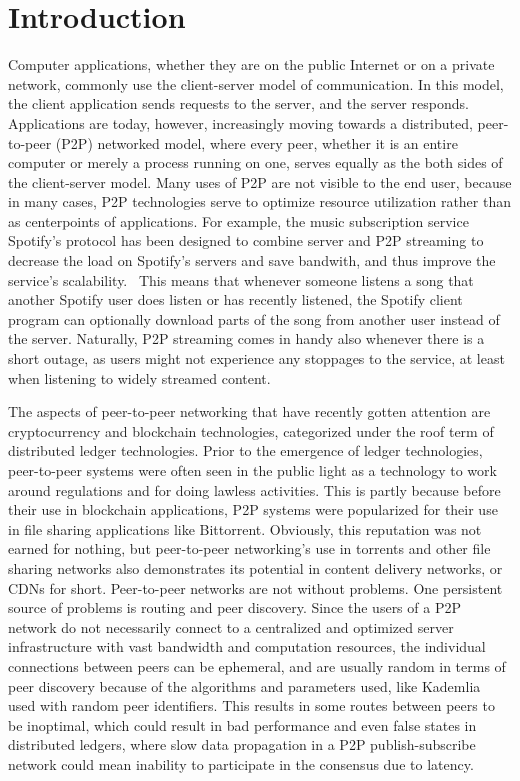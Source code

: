 \chapter{Introduction}
\label{Introduction}

Computer applications, whether they are on the public Internet or on a private network, commonly use the client-server model of communication. In this model, the client application sends requests to the server, and the server responds. Applications are today, however, increasingly moving towards a distributed, peer-to-peer (P2P) networked model, where every peer, whether it is an entire computer or merely a process running on one, serves equally as the both sides of the client-server model. Many uses of P2P are not visible to the end user, because in many cases, P2P technologies serve to optimize resource utilization rather than as centerpoints of applications. For example, the music subscription service Spotify's protocol has been designed to combine server and P2P streaming to decrease the load on Spotify's servers and save bandwith, and thus improve the service's scalability.~\cite{Kreitz_undated-yp} This means that whenever someone listens a song that another Spotify user does listen or has recently listened, the Spotify client program can optionally download parts of the song from another user instead of the server. Naturally, P2P streaming comes in handy also whenever there is a short outage, as users might not experience any stoppages to the service, at least when listening to widely streamed content.

The aspects of peer-to-peer networking that have recently gotten attention are cryptocurrency and blockchain technologies, categorized under the roof term of distributed ledger technologies. Prior to the emergence of ledger technologies, peer-to-peer systems were often seen in the public light as a technology to work around regulations and for doing lawless activities. This is partly because before their use in blockchain applications, P2P systems were popularized for their use in file sharing applications like Bittorrent. Obviously, this reputation was not earned for nothing, but peer-to-peer networking's use in torrents and other file sharing networks also demonstrates its potential in content delivery networks, or CDNs for short. Peer-to-peer networks are not without problems. One persistent source of problems is routing and peer discovery. Since the users of a P2P network do not necessarily connect to a centralized and optimized server infrastructure with vast bandwidth and computation resources, the individual connections between peers can be ephemeral, and are usually random in terms of peer discovery because of the algorithms and parameters used, like Kademlia used with random peer identifiers. This results in some routes between peers to be inoptimal, which could result in bad performance and even false states in distributed ledgers, where slow data propagation in a P2P publish-subscribe network could mean inability to participate in the consensus due to latency.

